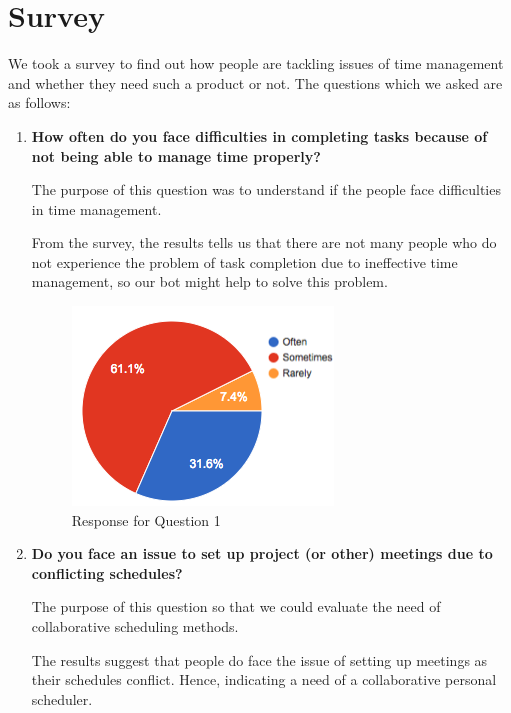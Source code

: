\documentclass{sig-alternate-05-2015}
\begin{document}
\section{Survey}
We took a survey to find out how people are tackling issues of time management and whether they need such a product or not. The questions which we asked are as follows:
\begin{enumerate}
  \item \textbf{How often do you face difficulties in completing tasks because of not being able to manage time properly?}
  \par
  The purpose of this question was to understand if the people face difficulties in time management. 
  \par
  From the survey, the results tells us that there are not many people who do not experience the problem of task completion due to ineffective time management, so our bot might help to solve this problem.
\begin{figure}[!htbp]
\includegraphics[scale = 0.5]{Difficulty}
\centering
\caption{Response for Question 1}
\end{figure}
  \item \textbf{Do you face an issue to set up project (or other) meetings due to conflicting schedules?}
  \par
  The purpose of this question so that we could evaluate the need of collaborative scheduling methods. 
  \par
  The results suggest that people do face the issue of setting up meetings as their schedules conflict. Hence, indicating a need of a collaborative personal scheduler.  
\begin{figure}[!htbp]
	

\end{figure}
\end{enumerate}
\end{document}
